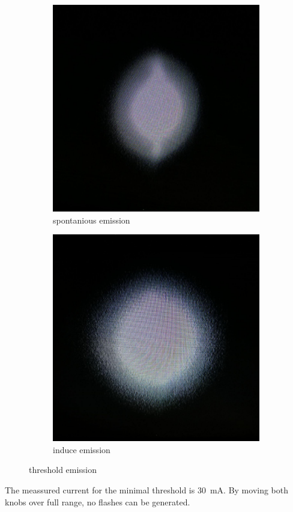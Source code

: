 \begin{figure}[h]
		\centering
		\begin{subfigure}[b]{0.45\textwidth}
				\begin{center}
						\includegraphics[width=0.9\linewidth]{./content/pictures/below_threshold.jpg}
						\caption{spontanious emission}
				\label{fig:spontanious}
				\end{center}
		\end{subfigure}
		\begin{subfigure}[b]{0.45\textwidth}
				\begin{center}
						\includegraphics[width=0.9\linewidth]{./content/pictures/above_threshold.jpg}
						\caption{induce emission}
						\label{fig:induce}
				\end{center}
		\end{subfigure}
		\caption{threshold emission}
		\label{fig:emission}
\end{figure}
The meassured current for the minimal threshold is \SI{30}{\milli\ampere}.
By moving both knobs over full range, no flashes can be generated.


